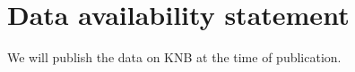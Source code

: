 \documentclass{article}\usepackage[]{graphicx}\usepackage[]{xcolor}
\begin{document}
\section*{Data availability statement}
We will publish the data on KNB at the time of publication.


 
\end{document}
